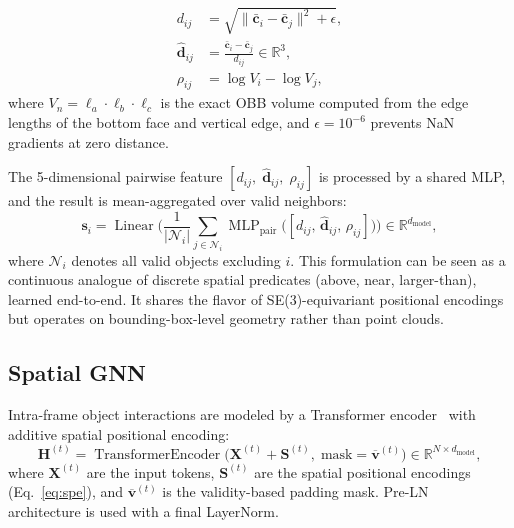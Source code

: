 \documentclass[runningheads]{llncs}
\newcommand{\mR}{\mathbb{R}}
\newcommand{\op}[1]{\operatorname{#1}}
\newcommand{\mat}[1]{\bm{#1}}
\begin{document}
\begin{align}
    d_{ij} &= \sqrt{\|\bar{\mat{c}}_i - \bar{\mat{c}}_j\|^2 + \epsilon}, \label{eq:dist} \\
    \hat{\mat{d}}_{ij} &= \frac{\bar{\mat{c}}_i - \bar{\mat{c}}_j}{d_{ij}} \in \mR^{3}, \label{eq:dir} \\
    \rho_{ij} &= \log V_i - \log V_j, \label{eq:volratio}
\end{align}
where $V_n = \ell_a \cdot \ell_b \cdot \ell_c$ is the exact OBB volume computed from the edge lengths of the bottom face and vertical edge, and $\epsilon = 10^{-6}$ prevents NaN gradients at zero distance.

The 5-dimensional pairwise feature $[d_{ij},\;\hat{\mat{d}}_{ij},\;\rho_{ij}]$ is processed by a shared MLP, and the result is mean-aggregated over valid neighbors:
\begin{equation}
    \mat{s}_i = \op{Linear}\Bigg(\frac{1}{|\mathcal{N}_i|}\sum_{j \in \mathcal{N}_i}\op{MLP}_{\text{pair}}\bigl([d_{ij},\,\hat{\mat{d}}_{ij},\,\rho_{ij}]\bigr)\Bigg) \in \mR^{d_{\text{model}}},
    \label{eq:spe}
\end{equation}
where $\mathcal{N}_i$ denotes all valid objects excluding $i$.
This formulation can be seen as a continuous analogue of discrete spatial predicates (above, near, larger-than), learned end-to-end.  It shares the flavor of SE(3)-equivariant positional encodings~\cite{fuchs2020se3} but operates on bounding-box-level geometry rather than point clouds.


\subsection{Spatial GNN}
\label{sec:spatial_gnn}

Intra-frame object interactions are modeled by a Transformer encoder~\cite{vaswani2017attention} with additive spatial positional encoding:
\begin{equation}
    \mat{H}^{(t)} = \op{TransformerEncoder}\bigl(\mat{X}^{(t)} + \mat{S}^{(t)},\; \text{mask}=\overline{\mat{v}}^{(t)}\bigr) \in \mR^{N \times d_{\text{model}}},
    \label{eq:spatial_gnn}
\end{equation}
where $\mat{X}^{(t)}$ are the input tokens, $\mat{S}^{(t)}$ are the spatial positional encodings (Eq.~\ref{eq:spe}), and $\overline{\mat{v}}^{(t)}$ is the validity-based padding mask.  Pre-LN~\cite{xiong2020layer} architecture is used with a final LayerNorm.
\end{document}
